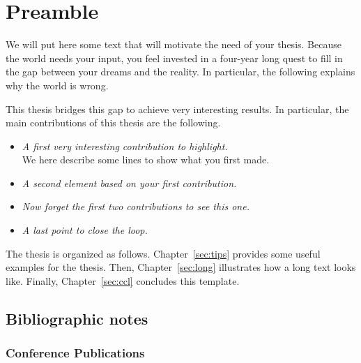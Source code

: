 \chapter*{Preamble}

We will put here some text that will motivate the need of your thesis.
Because the world needs your input, you feel invested in a four-year long quest to fill in the gap between your dreams and the reality.
In particular, the following explains why the world is wrong.

\lipsum[42]

This thesis bridges this gap to achieve very interesting results.
In particular, the main contributions of this thesis are the following.

\begin{itemize}
\item \textit{A first very interesting contribution to highlight.} \\

We here describe some lines to show what you first made.
\lipsum[2]

\item \textit{A second element based on your first contribution.} \\

\lipsum[5-6]

\item \textit{Now forget the first two contributions to see this one.} \\

\lipsum[9]

\item \textit{A last point to close the loop.} \\

\lipsum[13] 

\end{itemize}

The thesis is organized as follows.
Chapter~\ref{sec:tips} provides some useful examples for the thesis.
Then, Chapter~\ref{sec:long} illustrates how a long text looks like.
Finally, Chapter~\ref{sec:ccl} concludes this template.

\newpage

\section*{Bibliographic notes}

\subsection*{Conference Publications}

